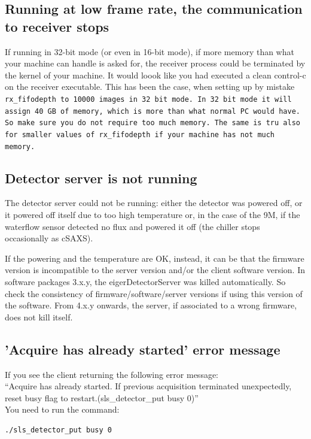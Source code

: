 \documentclass{article}
\begin{document}
{{{\subsection{Running at low frame rate, the communication to receiver stops}
If running in 32-bit mode (or even in 16-bit mode), if more memory than what your machine can handle is asked for, the receiver process could be terminated by the kernel of your machine. It would loook like you had executed a clean control-c on the receiver executable. This has been the case, when setting up by mistake
\tt{rx\_fifodepth} to 10000 images in 32 bit mode. In 32 bit mode it will assign 40~GB of memory, which is more than what normal PC would have. So make sure you do not require too much memory. The same is tru also for smaller values of {\tt{rx\_fifodepth}} if your  machine has not much memory.  

\subsection{Detector server is not running}\label{servernot}
The detector server could not be running: either the detector was powered off, or it powered off itself due to too high temperature or, in the case of the 9M, if the waterflow sensor detected no flux and powered it off (the chiller stops occasionally as cSAXS).

If the powering and the temperature are OK, instead, it can be that the firmware version is incompatible to the server version and/or the client software version. In software packages 3.x.y, the eigerDetectorServer was killed automatically. So check the consistency of firmware/software/server versions if using this version of the software. From 4.x.y onwards, the server, if associated to a wrong firmware, does not kill itself.   

\subsection{'Acquire has already started' error message}
If you see the client returning the following error message:\\ 
``Acquire has already started. If previous acquisition terminated unexpectedly, reset busy flag to restart.(sls\_detector\_put busy 0)''\\
 You need to run the command:
\begin{verbatim}
./sls_detector_put busy 0
\end{verbatim}

}}}
\end{document}
